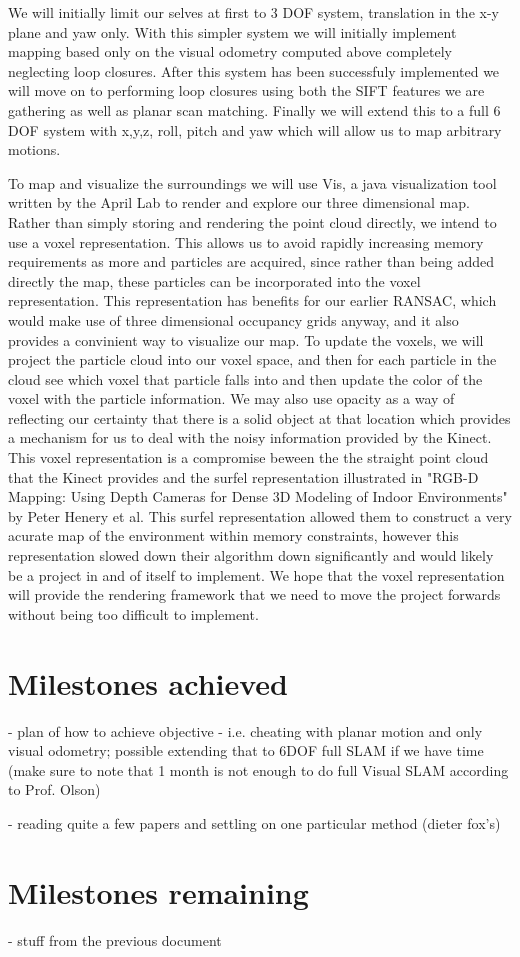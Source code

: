\documentclass[12pt]{article}
\begin{document}
	We will initially limit our selves at first to 3 DOF system, translation in the x-y plane and yaw only.  With this simpler system we will initially implement mapping based only on the visual odometry computed above completely neglecting loop closures.  After this system has been successfuly implemented we will move on to performing loop closures using both the SIFT features we are gathering as well as planar scan matching.  Finally we will extend this to a full 6 DOF system with x,y,z, roll, pitch and yaw which will allow us to map arbitrary motions.  

	To map and visualize the surroundings we will use Vis, a java visualization tool written by the April Lab to render and explore our three dimensional map.   Rather than simply storing and rendering the point cloud directly, we intend to use a voxel representation.  This allows us to avoid rapidly increasing memory requirements as more and particles are acquired, since rather than being added directly the map, these particles can be incorporated into the voxel representation.  This representation has benefits for our earlier RANSAC, which would make use of three dimensional occupancy grids anyway, and it also provides a convinient way to visualize our map.  To update the voxels, we will project the particle cloud into our voxel space, and then for each particle in the cloud see which voxel that particle falls into and then update the color of the voxel with the particle information.  We may also use opacity as a way of reflecting our certainty that there is a solid object at that location which provides a mechanism for us to deal with the noisy information provided by the Kinect.  This voxel representation is a compromise beween the the straight point cloud that the Kinect provides and the surfel representation illustrated in "RGB-D Mapping: Using Depth Cameras for Dense 3D Modeling of Indoor Environments" by Peter Henery et al. This surfel representation allowed them to construct a very acurate map of the environment within memory constraints, however this representation slowed down their algorithm down significantly and would likely be a project in and of itself to implement.  We hope that the voxel representation will provide the rendering framework that we need to move the project forwards without being too difficult to implement. 

\section{Milestones achieved}
- plan of how to achieve objective - i.e. cheating with planar motion and only visual odometry; possible extending that to 6DOF full SLAM if we have time (make sure to note that 1 month is not enough to do full Visual SLAM according to Prof. Olson)

- reading quite a few papers and settling on one particular method (dieter fox's)

\section{Milestones remaining}
- stuff from the previous document
\end{document}
